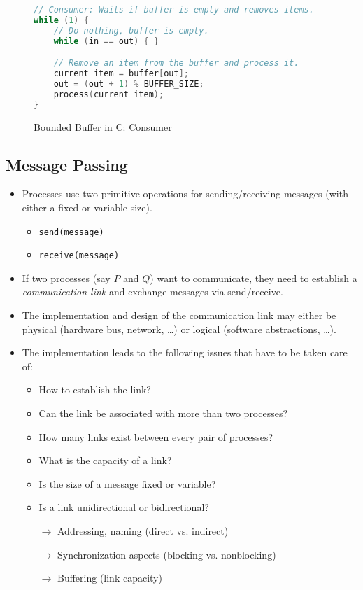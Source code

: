 	            \begin{figure}[H]
		            \centering
		            \begin{lstlisting}[language = C]
// Consumer: Waits if buffer is empty and removes items.
while (1) {
	// Do nothing, buffer is empty.
	while (in == out) { }

	// Remove an item from the buffer and process it.
	current_item = buffer[out];
	out = (out + 1) % BUFFER_SIZE;
	process(current_item);
}
\end{lstlisting}
		            \caption{Bounded Buffer in C: Consumer}
		        \end{figure}

        \subsection{Message Passing}
            \begin{itemize}
            	\item Processes use two primitive operations for sending/receiving messages (with either a fixed or variable size).
	                \begin{itemize}
	                	\item \texttt{send(message)}
	                	\item \texttt{receive(message)}
	                \end{itemize}
                \item If two processes (say \(P\) and \(Q\)) want to communicate, they need to establish a \textit{communication link} and exchange messages via send/receive.
                \item The implementation and design of the communication link may either be physical (hardware bus, network, \dots) or logical (software abstractions, \dots).
                \item The implementation leads to the following issues that have to be taken care of:
	                \begin{itemize}
	                	\item How to establish the link?
	                	\item Can the link be associated with more than two processes?
	                	\item How many links exist between every pair of processes?
	                	\item What is the capacity of a link?
	                	\item Is the size of a message fixed or variable?
	                	\item Is a link unidirectional or bidirectional?
	                	\item[\(\rightarrow\)] Addressing, naming (direct vs. indirect)
	                	\item[\(\rightarrow\)] Synchronization aspects (blocking vs. nonblocking)
	                	\item[\(\rightarrow\)] Buffering (link capacity)
	                \end{itemize}
            \end{itemize}

